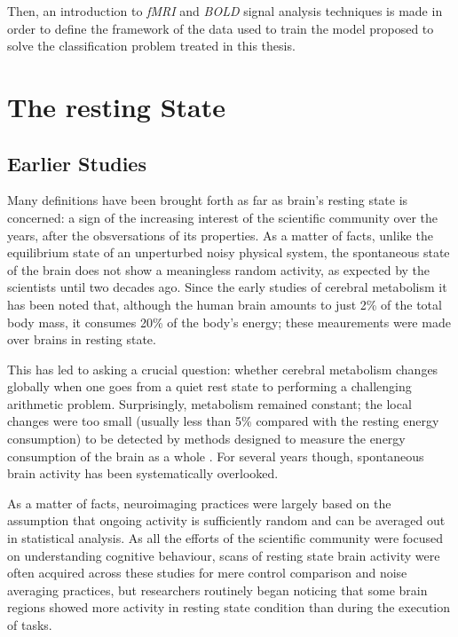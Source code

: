 \documentclass[12pt,openright,twoside,a4paper]{book}
\begin{document}
Then, an introduction to \textit{fMRI} and \textit{BOLD} signal analysis techniques is made in order to define the framework of the data used to train the model proposed to solve the classification problem treated in this thesis. 

\section{The resting State}

\subsection{Earlier Studies}

Many definitions have been brought forth as far as brain's resting state is concerned: a sign of the increasing interest of the scientific community over the years, after the obsversations of its properties.
As a matter of facts, unlike the equilibrium state of an unperturbed noisy physical system, the spontaneous state of the brain does not show a meaningless random activity, as expected by the scientists until two decades ago.
Since the early studies of cerebral metabolism it has been noted that, although the human brain amounts to just 2\% of the total body mass, it consumes 20\% of the body's energy; these meaurements were made over brains in resting state.

This has led to asking a crucial question: whether cerebral metabolism changes globally when one goes from a quiet rest state to performing a challenging arithmetic problem. 
Surprisingly, metabolism remained constant; the local changes were too small (usually less than 5\% compared with the resting energy consumption) to be detected by methods designed to measure the energy consumption of the brain as a whole \cite{Neuro-Hist}.
For several years though, spontaneous brain activity has been systematically overlooked.

As a matter of facts, neuroimaging practices were largely based on the assumption that ongoing activity is sufficiently random and can be averaged out in statistical analysis.
As all the efforts of the scientific community were focused on understanding cognitive behaviour, scans of resting state brain activity were often acquired across these studies for mere control comparison and noise averaging practices, but researchers routinely began noticing that some brain regions showed more activity in resting state condition than during the execution of tasks.
\end{document}

